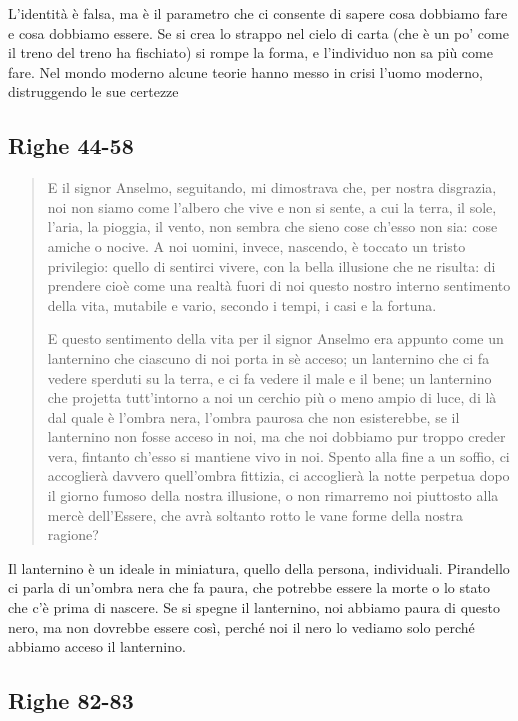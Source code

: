 \documentclass[a4paper, twoside, titlepage]{book}
\newcounter{mar}
\begin{document}
L’identità è falsa, ma è il parametro che ci consente di sapere cosa dobbiamo fare e cosa dobbiamo essere. Se si crea lo strappo nel cielo di carta (che è un po’ come il treno del treno ha fischiato) si rompe la forma, e l’individuo non sa più come fare.
Nel mondo moderno alcune teorie hanno messo in crisi l’uomo moderno, distruggendo le sue certezze

\subsection*{Righe 44-58}

\begin{quotation}
E il signor Anselmo, seguitando, mi dimostrava che, per nostra disgrazia, noi non siamo come l’albero che vive e non si sente, a cui la terra, il sole, l’aria, la pioggia, il vento, non sembra che sieno cose ch’esso non sia: cose amiche o nocive. A noi uomini, invece, nascendo, è toccato un tristo privilegio: quello di sentirci vivere, con la bella illusione che ne risulta: di prendere cioè come una realtà fuori di noi questo nostro interno sentimento della vita, mutabile e vario, secondo i tempi, i casi e la fortuna.

E questo sentimento della vita per il signor Anselmo era appunto come un lanternino che ciascuno di noi porta in sè acceso; un lanternino che ci fa vedere sperduti su la terra, e ci fa vedere il male e il bene; un lanternino che projetta tutt’intorno a noi un cerchio più o meno ampio di luce, di là dal quale è l’ombra nera, l’ombra paurosa che non esisterebbe, se il lanternino non fosse acceso in noi, ma che noi dobbiamo pur troppo creder vera, fintanto ch’esso si mantiene vivo in noi. Spento alla fine a un soffio, ci accoglierà davvero quell’ombra fittizia, ci accoglierà la notte perpetua dopo il giorno fumoso della nostra illusione, o non rimarremo noi piuttosto alla mercè dell’Essere, che avrà soltanto rotto le vane forme della nostra ragione?
\end{quotation}

Il lanternino è un ideale in miniatura, quello della persona, individuali.
Pirandello ci parla di un’ombra nera che fa paura, che potrebbe essere la morte o lo stato che c’è prima di nascere.
Se si spegne il lanternino, noi abbiamo paura di questo nero, ma non dovrebbe essere così, perché noi il nero lo vediamo solo perché abbiamo acceso il lanternino.

\subsection*{Righe 82-83}
\end{document}
